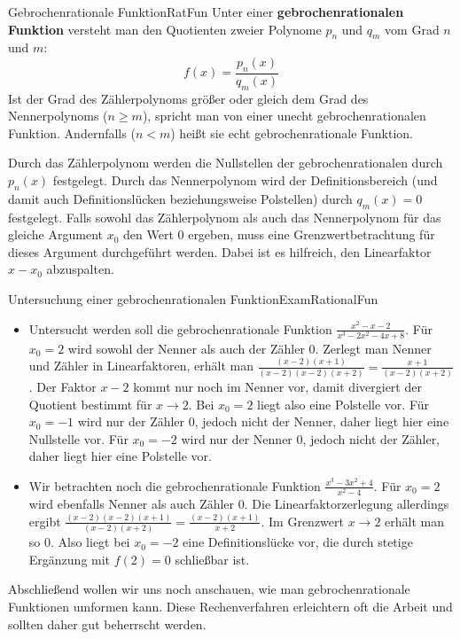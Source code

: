 \begin{definition}{Gebrochenrationale Funktion}{RatFun}
    Unter einer \textbf{gebrochenrationalen Funktion} versteht man den Quotienten zweier Polynome $p_n$ und $q_m$ vom Grad $n$ und $m$:
    $$
        f(x) = \frac{p_n(x)}{q_m(x)}
    $$
    Ist der Grad des Zählerpolynoms größer oder gleich dem Grad des Nennerpolynoms ($n \ge m$), spricht man von einer unecht gebrochenrationalen Funktion. Andernfalls ($n < m$) heißt sie echt gebrochenrationale Funktion.
\end{definition}

Durch das Zählerpolynom werden die Nullstellen der gebrochenrationalen durch $p_n(x)$ festgelegt. Durch das Nennerpolynom wird der Definitionsbereich (und damit auch Definitionslücken beziehungsweise Polstellen) durch $q_m(x) = 0$ festgelegt. Falls sowohl das Zählerpolynom als auch das Nennerpolynom für das gleiche Argument $x_0$ den Wert $0$ ergeben, muss eine Grenzwertbetrachtung für dieses Argument durchgeführt werden. Dabei ist es hilfreich, den Linearfaktor $x-x_0$ abzuspalten.

\begin{example}{Untersuchung einer gebrochenrationalen Funktion}{ExamRationalFun}
    \begin{itemize}
        \item Untersucht werden soll die gebrochenrationale Funktion $\frac{x^2-x-2}{x^3-2x^2-4x+8}$. Für $x_0=2$ wird sowohl der Nenner als auch der Zähler $0$. Zerlegt man Nenner und Zähler in Linearfaktoren, erhält man $\frac{(x-2)(x+1)}{(x-2)(x-2)(x+2)} = \frac{x+1}{(x-2)(x+2)}$. Der Faktor $x-2$ kommt nur noch im Nenner vor, damit divergiert der Quotient bestimmt für $x\to 2$. Bei $x_0=2$ liegt also eine Polstelle vor. Für $x_0=-1$ wird nur der Zähler $0$, jedoch nicht der Nenner, daher liegt hier eine Nullstelle vor. Für $x_0=-2$ wird nur der Nenner $0$, jedoch nicht der Zähler, daher liegt hier eine Polstelle vor.
        \item Wir betrachten noch die gebrochenrationale Funktion $\frac{x^3-3x^2+4}{x^2-4}$. Für $x_0=2$ wird ebenfalls Nenner als auch Zähler $0$. Die Linearfaktorzerlegung allerdings ergibt $\frac{(x-2)(x-2)(x+1)}{(x-2)(x+2)} = \frac{(x-2)(x+1)}{x+2}$. Im Grenzwert $x \to 2$ erhält man so $0$. Also liegt bei $x_0=-2$ eine Definitionslücke vor, die durch stetige Ergänzung mit $f(2)=0$ schließbar ist.
    \end{itemize}
\end{example}

Abschließend wollen wir uns noch anschauen, wie man gebrochenrationale Funktionen umformen kann. Diese Rechenverfahren erleichtern oft die Arbeit und sollten daher gut beherrscht werden.

